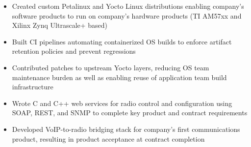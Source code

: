\begin{itemize}
    \item Created custom Petalinux and Yocto Linux distributions enabling company's software products to run on company's hardware products (TI AM57xx and Xilinx Zynq Ultrascale+ based)
    \item Built CI pipelines automating containerized OS builds to enforce artifact retention policies and prevent regressions
    \item Contributed patches to upstream Yocto layers, reducing OS team maintenance burden as well as enabling reuse of application team build infrastructure
    \item Wrote C and C++ web services for radio control and configuration using SOAP, REST, and SNMP to complete key product and contract requirements
    \item Developed VoIP-to-radio bridging stack for company's first communications product, resulting in product acceptance at contract completion
\end{itemize}
